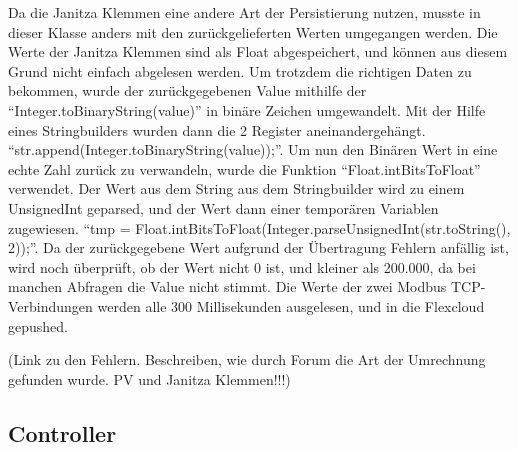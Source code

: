 Da die Janitza Klemmen eine andere Art der Persistierung nutzen, musste in dieser Klasse anders mit den zurückgelieferten Werten umgegangen werden. Die Werte der Janitza Klemmen sind als Float abgespeichert, und können aus diesem Grund nicht einfach abgelesen werden. Um trotzdem die richtigen Daten zu bekommen, wurde der zurückgegebenen Value mithilfe der “Integer.toBinaryString(value)” in binäre Zeichen umgewandelt. Mit der Hilfe eines Stringbuilders wurden dann die 2 Register aneinandergehängt. “str.append(Integer.toBinaryString(value));”. Um nun den Binären Wert in eine echte Zahl zurück zu verwandeln, wurde die Funktion “Float.intBitsToFloat” verwendet. Der Wert aus dem String aus dem Stringbuilder wird zu einem UnsignedInt geparsed, und der Wert dann einer temporären Variablen zugewiesen. “tmp = Float.intBitsToFloat(Integer.parseUnsignedInt(str.toString(), 2));”. Da der zurückgegebene Wert aufgrund der Übertragung Fehlern anfällig ist, wird noch überprüft, ob der Wert nicht 0 ist, und kleiner als 200.000, da bei manchen Abfragen die Value nicht stimmt. Die Werte der zwei Modbus TCP-Verbindungen werden alle 300 Millisekunden ausgelesen, und in die Flexcloud gepushed.  

(Link zu den Fehlern. Beschreiben, wie durch Forum die Art der Umrechnung gefunden wurde. PV und Janitza Klemmen!!!) 

\subsection*{Controller}



